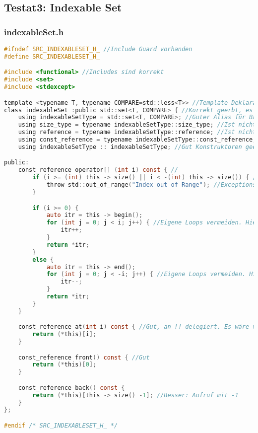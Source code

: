 
\subsection{Testat3: Indexable Set}
\subsubsection{indexableSet.h}
\begin{lstlisting}[style=frame, style= linenumbers, language=C]
#ifndef SRC_INDEXABLESET_H_ //Include Guard vorhanden
#define SRC_INDEXABLESET_H_

#include <functional> //Includes sind korrekt
#include <set>
#include <stdexcept>

template <typename T, typename COMPARE=std::less<T>> //Template Deklaration ist korrekt
class indexableSet :public std::set<T, COMPARE> { //Korrekt geerbt, es hätte auch direkt struct als Keyword verwendet werden können, da sowieso alles public ist
	using indexableSetType = std::set<T, COMPARE>; //Guter Alias für Base-Class
	using size_type = typename indexableSetType::size_type; //Ist nicht verwendet. Stattdessen hätte man einen index_type Alias machen können
	using reference = typename indexableSetType::reference; //Ist nicht verwendet
	using const_reference = typename indexableSetType::const_reference; //Gut
	using indexableSetType :: indexableSetType; //Gut Konstruktoren geerbt

public:
	const_reference operator[] (int i) const { //
		if (i >= (int) this -> size() || i < -(int) this -> size()) { //Besser static_cast als C-Style-Cast verwenden, size in eine lokale Variable auslagern, dann reduziert sich der duplizierte Code.
			throw std::out_of_range("Index out of Range"); //Exceptions auch mit {} initialisieren
		}

		if (i >= 0) {
			auto itr = this -> begin();
			for (int j = 0; j < i; j++) { //Eigene Loops vermeiden. Hier besser mit next/advance arbeiten.
				itr++;
			}
			return *itr;
		}
		else {
			auto itr = this -> end();
			for (int j = 0; j < -i; j++) { //Eigene Loops vermeiden. Hier besser mit next/advance arbeiten.
				itr--;
			}
			return *itr;
		}
	}

	const_reference at(int i) const { //Gut, an [] delegiert. Es wäre vom Code her schöner gewesen die Implementation in at() zu haben und diese in den anderen Funktionen aufzurufen.
		return (*this)[i];
	}

	const_reference front() const { //Gut
		return (*this)[0];
	}

	const_reference back() const {
		return (*this)[this -> size() -1]; //Besser: Aufruf mit -1
	}
};

#endif /* SRC_INDEXABLESET_H_ */
\end{lstlisting}

